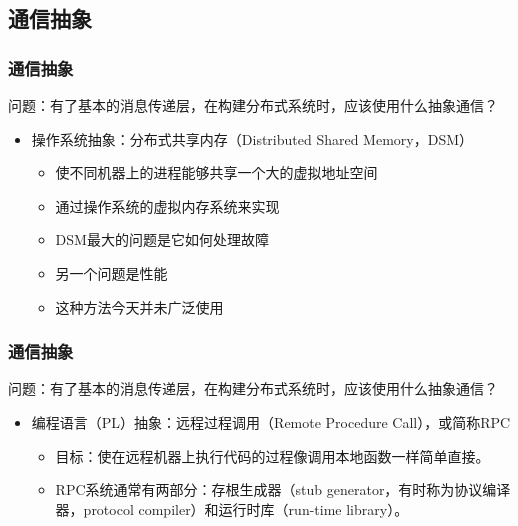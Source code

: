 \subsection{通信抽象} %
\begin{frame}[fragile]
    \frametitle{通信抽象}
    问题：有了基本的消息传递层，在构建分布式系统时，应该使用什么抽象通信？
    \begin{itemize}
        \item 操作系统抽象：分布式共享内存（Distributed Shared Memory，DSM）
                    \begin{itemize}
            \item 使不同机器上的进程能够共享一个大的虚拟地址空间
            \item 通过操作系统的虚拟内存系统来实现
            \item DSM最大的问题是它如何处理故障
            \item 另一个问题是性能
            \item 这种方法今天并未广泛使用
        \end{itemize}
    \end{itemize}
    
\end{frame}

\begin{frame}[fragile]
    \frametitle{通信抽象}
    问题：有了基本的消息传递层，在构建分布式系统时，应该使用什么抽象通信？
    \begin{itemize}
        \item 编程语言（PL）抽象：远程过程调用（Remote Procedure Call），或简称RPC
        \begin{itemize}
            \item 目标：使在远程机器上执行代码的过程像调用本地函数一样简单直接。
            \item RPC系统通常有两部分：存根生成器（stub generator，有时称为协议编译器，protocol compiler）和运行时库（run-time library）。
        \end{itemize}
    \end{itemize}
    
\end{frame}

